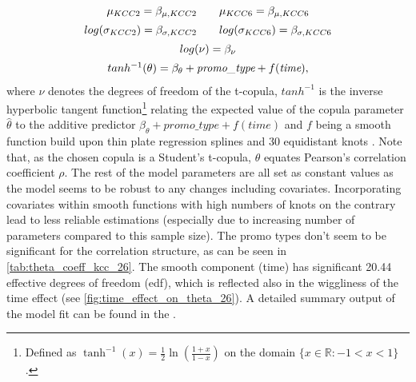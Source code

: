 \begin{equation}
\begin{array}{c}
\mu_{KCC 2}=\beta_{\mu,KCC2} \qquad \mu_{KCC 6}=\beta_{\mu,KCC6}  \\  \noalign{\vskip5pt}

log(\sigma_{KCC 2})=\beta_{\sigma,KCC2} \qquad log(\sigma_{KCC 6})=\beta_{\sigma,KCC6} \\  \noalign{\vskip5pt}

log(\nu) = \beta_{\nu} \\  \noalign{\vskip5pt}

tanh^{-1}(\theta)=\beta_{\theta} + \textit{promo\_type} +f(\textit{time}),
\end{array}
\label{eq:gjrm_formula_26}
\end{equation} 
where $\nu$ denotes the degrees of freedom of the t-copula, $tanh^{-1}$ is the inverse hyperbolic tangent function\footnote{Defined as $\tanh ^{-1} (x)=\frac{1}{2} \ln \left(\frac{1+x}{1-x}\right)$ on the domain $ \{ x \in \mathbb{R}:-1<x<1\}$.} relating the expected value of the copula parameter $\hat{\theta}$ to the additive predictor $\beta_{\theta}+ \textit{promo\_type} +f\left(\textit{time}\right)$ and $f$ being a smooth function build upon thin plate regression splines and 30 equidistant knots \citep{wood2017generalized}. Note that, as the chosen copula is a Student's t-copula, $\theta$ equates Pearson's correlation coefficient $\rho$. The rest of the model parameters are all set as constant values as the model seems to be robust to any changes including covariates. Incorporating covariates within smooth functions with high numbers of knots on the contrary lead to less reliable estimations (especially due to increasing number of parameters compared to this sample size). The promo types don't seem to be significant for the correlation structure, as can be seen in \autoref{tab:theta_coeff_kcc_26}. The smooth component (time) has significant 20.44 effective degrees of freedom (edf), which is reflected also in the wiggliness of the time effect (see \autoref{fig:time_effect_on_theta_26}). A detailed summary output of the model fit can be found in the . \\




